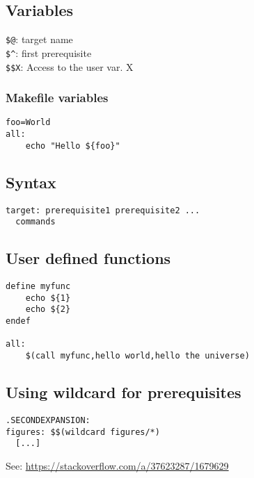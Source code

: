 \subsection{Variables}
\verb|$@|: target name\\
\verb|$^|: first prerequisite\\
\verb|$$X|: Access to the user var. X\\
\subsubsection{Makefile variables}
\begin{verbatim}
foo=World
all:
    echo "Hello ${foo}"
\end{verbatim}

\subsection{Syntax}
\begin{verbatim}
target: prerequisite1 prerequisite2 ...
  commands
\end{verbatim}

\subsection{User defined functions}
\begin{verbatim}
define myfunc
    echo ${1}
    echo ${2}
endef

all:
    $(call myfunc,hello world,hello the universe)
\end{verbatim}

\subsection{Using wildcard for prerequisites}
\begin{verbatim}
.SECONDEXPANSION:
figures: $$(wildcard figures/*)
  [...]
\end{verbatim}
See: \url{https://stackoverflow.com/a/37623287/1679629}
